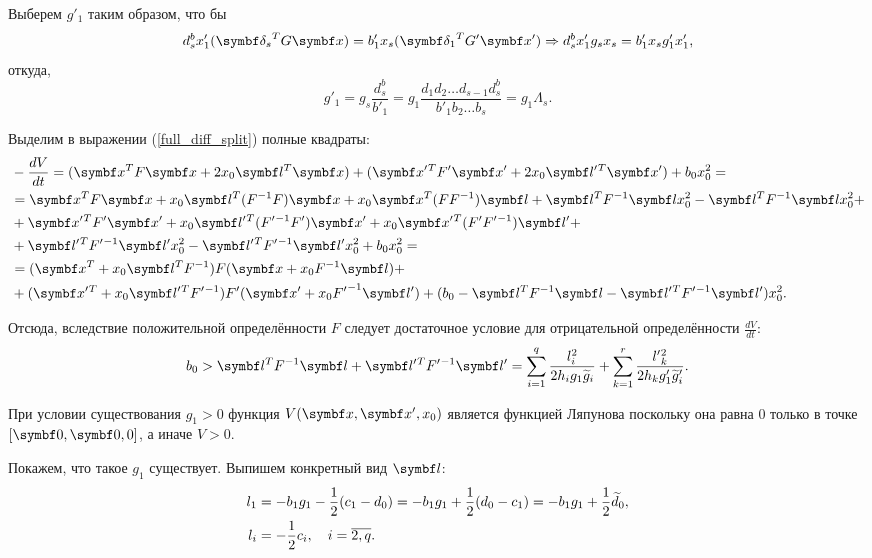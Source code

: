 Выберем \(g'_1\) таким образом, что бы
\begin{equation} \label{split_delta_g1}
    d^b_s x'_1 (\mb{\delta_s}^T G \mb{x}) = b'_1 x_s (\mb{\delta_1}^T G' \mb{x'}) \Rightarrow 
    d^b_s x'_1 g_s x_s = b'_1 x_s g'_1 x'_1,
\end{equation}
откуда,
\begin{equation}
    g'_1 = g_s \frac{d^b_s}{b'_1} = g_1 \frac{d_1 d_2 \dots d_{s-1} d^b_s}{b'_1 b_2 \dots b_s} = g_1 \Lambda_s.
\end{equation}

Выделим в выражении (\ref{full_diff_split}) полные квадраты:
\begin{equation*}
    \begin{split}
        & -\frac{dV}{dt} = (\mb{x}^T F \mb{x} + 2 x_0 \mb{l}^T \mb{x}) + (\mb{x'}{}^T F' \mb{x'} + 2 x_0 \mb{l'}{}^T \mb{x'}) + b_0 x_0^2 = \\
        & = \mb{x}^T F \mb{x} + x_0 \mb{l}^T (F^{-1} F) \mb{x} + x_0 \mb{x}^T (F F^{-1}) \mb{l} + \mb{l}^T F^{-1} \mb{l} x^2_0 - \mb{l}^T F^{-1} \mb{l} x^2_0 + \\
        & + \mb{x'}{}^T F' \mb{x'} + x_0 \mb{l'}{}^T (F'{}^{-1} F') \mb{x'} + x_0 \mb{x'}{}^T (F' F'{}^{-1}) \mb{l'} + \\
        & + \mb{l'}{}^T F'{}^{-1} \mb{l'} x^2_0 - \mb{l'}{}^T F'{}^{-1} \mb{l'} x^2_0 + b_0 x_0^2 = \\
        & = (\mb{x}^T + x_0 \mb{l}^T F^{-1})F(\mb{x} + x_0 F^{-1} \mb{l}) + \\
        & + (\mb{x'}{}^T + x_0 \mb{l'}{}^T F'{}^{-1})F'(\mb{x'} + x_0 F{'}^{-1} \mb{l'}) + (b_0 - \mb{l}^T F^{-1} \mb{l} - \mb{l'}{}^T F'{}^{-1} \mb{l'}) x^2_0.
    \end{split}
\end{equation*}

Отсюда, вследствие положительной определённости \(F\) следует достаточное условие для отрицательной определённости \(\frac{dV}{dt}\):
\begin{equation} \label{split_b_dost}
    b_0 > \mb{l}^T F^{-1} \mb{l} + \mb{l'}{}^T F'{}^{-1} \mb{l'} = \sum_{i=1}^{q} \frac{l^2_i}{2h_i g_1 \wt{g}_i} + \sum_{k=1}^{r} \frac{l'{}^2_k}{2h_k g'_1 \wt{g}'_i}.
\end{equation}

При условии существования \(g_1 > 0\) функция \(V(\mb{x}, \mb{x'}, x_0)\) является функцией Ляпунова поскольку она равна \(0\) только в точке \([\mb{0}, \mb{0}, 0]\), а иначе \(V > 0\).

Покажем, что такое \(g_1\) существует. Выпишем конкретный вид \(\mb{l}\):
\begin{equation}
    \begin{split}
        l_1 &= -b_1 g_1 - \frac{1}{2} (c_1 - d_0) = -b_1 g_1 + \frac{1}{2} (d_0 - c_1) = -b_1 g_1 + \frac{1}{2} \widetilde{d}_0, \\
        l_i &= -\frac{1}{2} c_i, \quad i=\overline{2,q}.
    \end{split}
\end{equation}

